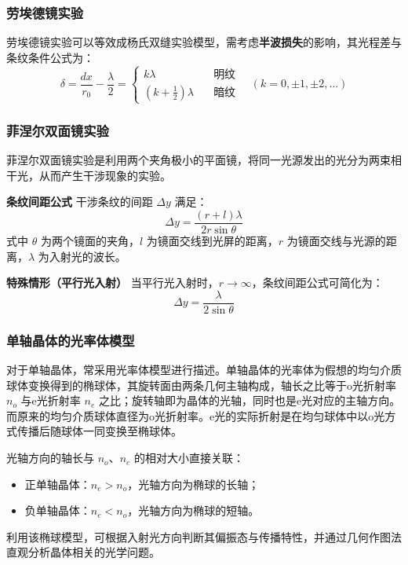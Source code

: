 \documentclass{article}
\begin{document}
	\subsubsection{劳埃德镜实验}
	劳埃德镜实验可以等效成杨氏双缝实验模型，需考虑\textbf{半波损失}的影响，其光程差与条纹条件公式为：
	\[
	\delta = \frac{dx}{r_0} - \frac{\lambda}{2}=
	\begin{cases}
		k\lambda \quad &\text{明纹} \\
		\left(k+\frac{1}{2}\right)\lambda \quad &\text{暗纹}
	\end{cases}
	\quad (k=0,\pm1,\pm2,\dots)
	\]
	
	\subsubsection{菲涅尔双面镜实验}
	菲涅尔双面镜实验是利用两个夹角极小的平面镜，将同一光源发出的光分为两束相干光，从而产生干涉现象的实验。
	
	\textbf{条纹间距公式}
	干涉条纹的间距 $\Delta y$ 满足：
	\[
	\Delta y=\frac{(r+l)\lambda}{2r\sin\theta}
	\]
	式中 $\theta$ 为两个镜面的夹角，$l$ 为镜面交线到光屏的距离，$r$ 为镜面交线与光源的距离，$\lambda$ 为入射光的波长。
	
	\textbf{特殊情形（平行光入射）}
	当平行光入射时，$r\to\infty$，条纹间距公式可简化为：
	\[
	\Delta y=\frac{\lambda}{2\sin\theta}
	\]
	
	\subsubsection{单轴晶体的光率体模型}
	
	对于单轴晶体，常采用光率体模型进行描述。单轴晶体的光率体为假想的均匀介质球体变换得到的椭球体，其旋转面由两条几何主轴构成，轴长之比等于o光折射率 $n_o$ 与e光折射率 $n_e$ 之比；旋转轴即为晶体的光轴，同时也是e光对应的主轴方向。而原来的均匀介质球体直径为o光折射率。e光的实际折射是在均匀球体中以o光方式传播后随球体一同变换至椭球体。
	
	光轴方向的轴长与 $n_o$、$n_e$ 的相对大小直接关联：
	\begin{itemize}[leftmargin=2em]
		\item 正单轴晶体：$n_e > n_o$，光轴方向为椭球的长轴；
		\item 负单轴晶体：$n_e < n_o$，光轴方向为椭球的短轴。
	\end{itemize}
	
	利用该椭球模型，可根据入射光方向判断其偏振态与传播特性，并通过几何作图法直观分析晶体相关的光学问题。
	
\end{document}
